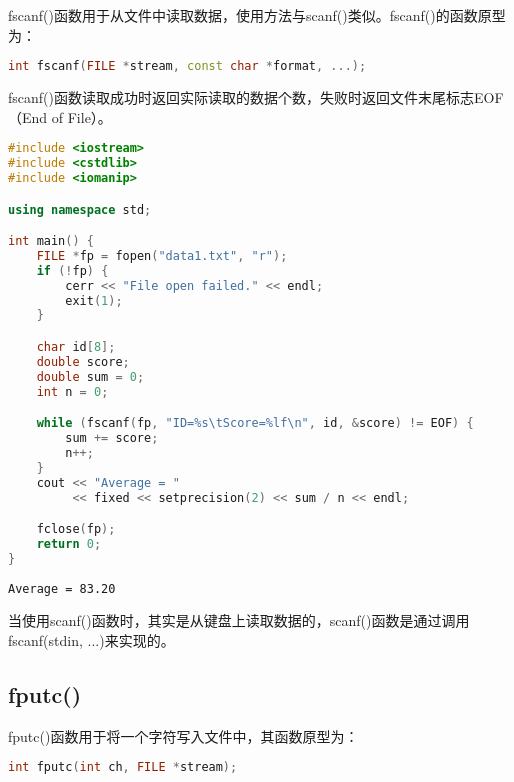 fscanf()函数用于从文件中读取数据，使用方法与scanf()类似。fscanf()的函数原型为：

\vspace{-0.5cm}

\begin{lstlisting}[language=C++]
int fscanf(FILE *stream, const char *format, ...);
\end{lstlisting}

fscanf()函数读取成功时返回实际读取的数据个数，失败时返回文件末尾标志EOF（End of File）。\\


\begin{lstlisting}[language=C++]
#include <iostream>
#include <cstdlib>
#include <iomanip>

using namespace std;

int main() {
    FILE *fp = fopen("data1.txt", "r");
    if (!fp) {
        cerr << "File open failed." << endl;
        exit(1);
    }

    char id[8];
    double score;
    double sum = 0;
    int n = 0;

    while (fscanf(fp, "ID=%s\tScore=%lf\n", id, &score) != EOF) {
        sum += score;
        n++;
    }
    cout << "Average = "
         << fixed << setprecision(2) << sum / n << endl;

    fclose(fp);
    return 0;
}
\end{lstlisting}

\begin{tcolorbox}
    \begin{verbatim}
Average = 83.20
	\end{verbatim}
\end{tcolorbox}

当使用scanf()函数时，其实是从键盘上读取数据的，scanf()函数是通过调用fscanf(stdin, ...)来实现的。\\

\subsection{fputc()}

fputc()函数用于将一个字符写入文件中，其函数原型为：

\vspace{-0.5cm}

\begin{lstlisting}[language=C++]
int fputc(int ch, FILE *stream);
\end{lstlisting}

